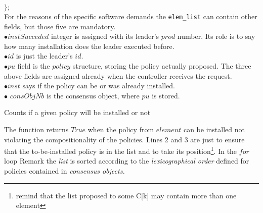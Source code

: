 \documentclass{article}
\begin{document}
$\rbrace ;$\\
For the reasons of the specific software demands the \texttt{elem\_list} can contain other fields, but those five are mandatory.\\
$\bullet instSucceded$ integer is assigned with its leader's $prod$ number. Its role is to say how many installation does the leader executed before. \\
$\bullet id$ is just the leader's $id$.\\
$\bullet pu$ field is the $policy$ structure, storing the policy actually proposed. The three above fields are assigned already when the controller receives the request.\\
$\bullet inst$ says if the policy can be or was already installed.\\
$\bullet$ $consObjNb$ is the consensus object, where $pu$ is stored.\\


\begin{algorithm}
\caption{Counts if a given policy will be installed or not}
\begin{algorithmic}[1]
		\State k $\gets$ take index of $element$ in the list
	\EndIf
		\State last$\gets$ the latest element from $installed$
		\State last$_{idx}\gets$ index of last in $list$
		\State {}
				\State list[i].inst = $True$
				\State installed.append(list[i])
			\Else {list[i}.inst = false}			
			\EndIf	
		\EndFor		
		\State $installed$.append(list[i])\Comment{if it was not yet appended} 
			\State \Return $True$
	\Else \Return $False$			
	\EndIf
	\For { i in 0 to k}
		\If { list[i].inst = false}	
			
		\EndIf
	\EndFor	\\
	\Return $False$
	\EndProcedure
\end{algorithmic}
\end{algorithm}
The function returns $True$ when the policy from $element$ can be installed not violating the compositionality of the policies. Lines 2 and 3 are just to ensure that the to-be-installed policy is in the list and to take its position\footnote{remind that the list proposed to some C[k] may contain more than one element}. In the $for$ loop 
Remark the \emph{list} is sorted according to the \emph{lexicographical order} defined for policies contained in \emph{consensus objects.} \\
\end{document}
